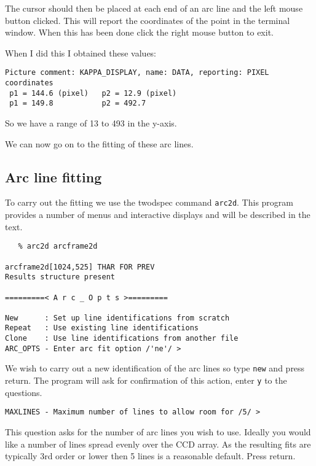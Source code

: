 \documentclass[twoside,11pt]{article}
\newcommand{\xref}[3]{#1}
\newcommand{\scspec}[2]{#1}
\newcommand{\scspec}[2]{#2}
\begin{document}
The cursor should then be placed at each end of an arc line and the
left mouse button clicked. This will report the coordinates of the
point in the terminal window. When this has been done click the right
mouse button to exit.

When I did this I obtained these values:

{
\scspec{\small}{ }
\begin{verbatim}
Picture comment: KAPPA_DISPLAY, name: DATA, reporting: PIXEL coordinates
 p1 = 144.6 (pixel)   p2 = 12.9 (pixel)
 p1 = 149.8           p2 = 492.7
\end{verbatim}
}

So we have a range of 13 to 493 in the y-axis.

We can now go on to the fitting of these arc lines.

\subsection{Arc line fitting}

To carry out the fitting we use the \xref{{\sc twodspec}}{sun16}{}
command {\tt arc2d}. This program provides a number of menus and
interactive displays and will be described in the text.


{
\scspec{\small}{ }
\begin{verbatim}
   % arc2d arcframe2d

arcframe2d[1024,525] THAR FOR PREV
Results structure present

=========< A r c _ O p t s >=========

New      : Set up line identifications from scratch
Repeat   : Use existing line identifications
Clone    : Use line identifications from another file
ARC_OPTS - Enter arc fit option /'ne'/ >

\end{verbatim}
}

We wish to carry out a new identification of the arc lines so type
{\tt new} and press return. The program will ask for confirmation of
this action, enter {\tt y} to the questions.

{
\scspec{\small}{ }
\begin{verbatim}
MAXLINES - Maximum number of lines to allow room for /5/ >
\end{verbatim}
}

This question asks for the number of arc lines you wish to use.
Ideally you would like a number of lines spread evenly over the CCD
array. As the resulting fits are typically 3rd order or lower then 5
lines is a reasonable default. Press return.
\end{document}
